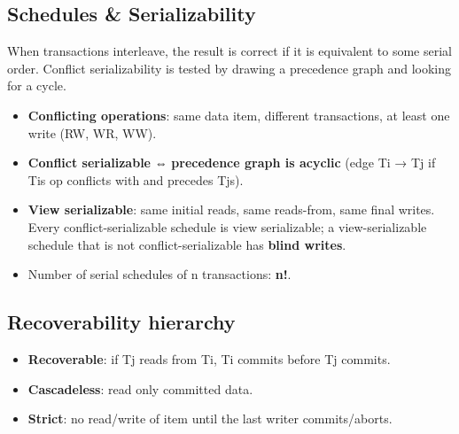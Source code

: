 

\needspace{125pt}

\hypertarget{p2-04--schedules--serializability}{%
\subsection{Schedules \& Serializability}\label{p2-04--schedules--serializability}}

When transactions interleave, the result is correct if it is equivalent to some serial order. Conflict
serializability is tested by drawing a precedence graph and looking for a cycle.

\begin{itemize}
\tightlist
\item
  \textbf{Conflicting operations}: same data item, different transactions, at least one write (RW, WR, WW).
\item
  \textbf{Conflict serializable} ⇔ \textbf{precedence graph is acyclic} (edge Ti → Tj if Ti\textquotesingle s op conflicts with and precedes Tj\textquotesingle s).
\item
  \textbf{View serializable}: same initial reads, same reads-from, same final writes. Every conflict-serializable schedule is view serializable; a view-serializable schedule that is not conflict-serializable has \textbf{blind writes}.
\item
  Number of serial schedules of n transactions: \textbf{n!}.
\end{itemize}



\needspace{95pt}

\hypertarget{p2-04--recoverability-hierarchy}{%
\subsection{Recoverability hierarchy}\label{p2-04--recoverability-hierarchy}}



\begin{itemize}
\tightlist
\item
  \textbf{Recoverable}: if Tj reads from Ti, Ti commits before Tj commits.
\item
  \textbf{Cascadeless}: read only committed data.
\item
  \textbf{Strict}: no read/write of item until the last writer commits/aborts.
\end{itemize}

